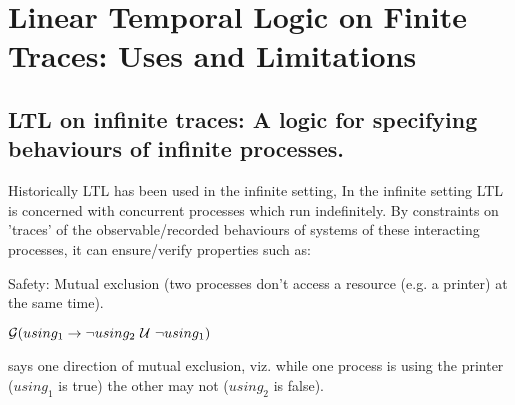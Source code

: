 
\section{Linear Temporal Logic on Finite Traces: Uses and Limitations}

\subsection{LTL on infinite traces: A logic for specifying behaviours of infinite processes.}
Historically LTL has been used in the infinite setting,
In the infinite setting LTL is concerned with concurrent processes which run indefinitely. By constraints on 'traces' of the observable/recorded behaviours of systems of these interacting processes, it can ensure/verify properties such as:

Safety:
Mutual exclusion (two processes don't access a resource
(e.g. a printer) at the same time).
\begin{center}
  $\mathcal{G}(using_1 \to \neg using_2 \ \mathcal{U}\  \neg using_1)$
\end{center}
says one direction of mutual exclusion,
viz. while one process is using the printer ($using_1$ is true)
the other may not ($using_2$ is false).

